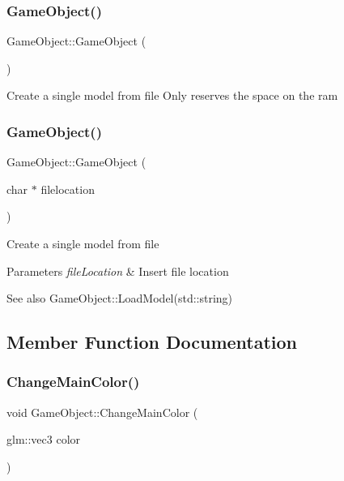 \subsubsection{\texorpdfstring{GameObject()}{GameObject()}\hspace{0.1cm}{\footnotesize\ttfamily [1/2]}}
{\footnotesize\ttfamily Game\+Object\+::\+Game\+Object (\begin{DoxyParamCaption}{ }\end{DoxyParamCaption})}

Create a single model from file Only reserves the space on the ram \mbox{\label{class_game_object_a2a40f6eac86bddffbf44d86f1fcb93ec}} 
\subsubsection{\texorpdfstring{GameObject()}{GameObject()}\hspace{0.1cm}{\footnotesize\ttfamily [2/2]}}
{\footnotesize\ttfamily Game\+Object\+::\+Game\+Object (\begin{DoxyParamCaption}\item[{char $\ast$}]{filelocation }\end{DoxyParamCaption})}

Create a single model from file 
\begin{DoxyParams}{Parameters}
{\em file\+Location} & Insert file location \\
\hline
\end{DoxyParams}
\begin{DoxySeeAlso}{See also}
Game\+Object\+::\+Load\+Model(std\+::string) 
\end{DoxySeeAlso}


\subsection{Member Function Documentation}
\mbox{\label{class_game_object_afafffefaf209ad57a5d6ce551d7cb31b}} 
\subsubsection{\texorpdfstring{ChangeMainColor()}{ChangeMainColor()}\hspace{0.1cm}{\footnotesize\ttfamily [1/3]}}
{\footnotesize\ttfamily void Game\+Object\+::\+Change\+Main\+Color (\begin{DoxyParamCaption}\item[{glm\+::vec3}]{color }\end{DoxyParamCaption})}

